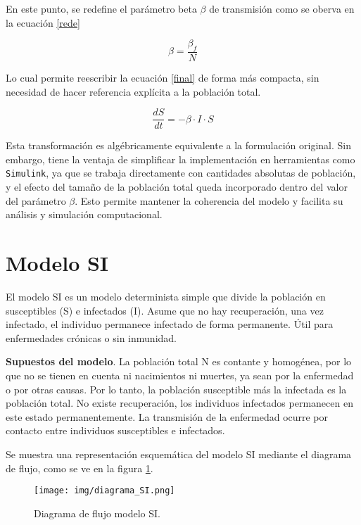 En este punto, se redefine el parámetro beta $\beta$ de transmisión como se oberva en la ecuación \eqref{rede} 

\begin{equation}
    \beta = \frac{\beta_f}{N}
\label{rede}
\end{equation}

Lo cual permite reescribir la ecuación \eqref{final} de forma más compacta, sin necesidad de hacer referencia explícita a la población total.

\begin{equation}
    \frac{dS}{dt} = -\beta \cdot I \cdot S
\label{final}
\end{equation}

Esta transformación es algébricamente equivalente a la formulación original. Sin embargo, tiene la ventaja de simplificar la implementación en herramientas como \texttt{Simulink}, ya que se trabaja directamente con cantidades absolutas de población, y el efecto del tamaño de la población total queda incorporado dentro del valor del parámetro \( \beta \). Esto permite mantener la coherencia del modelo y facilita su análisis y simulación computacional.





\section{Modelo SI}
El modelo SI es un modelo determinista simple que divide la población en susceptibles (S) e infectados (I). Asume que no hay recuperación, una vez infectado, el individuo permanece infectado de forma permanente. Útil para enfermedades crónicas o sin inmunidad.

\textbf{Supuestos del modelo}. La población total N es contante y homogénea, por lo que no se tienen en cuenta ni nacimientos ni muertes, ya sean por la enfermedad o por otras causas. Por lo tanto, la población susceptible más la infectada es la población total. No existe recuperación, los individuos infectados permanecen en este estado permanentemente. La transmisión de la enfermedad ocurre por contacto entre individuos susceptibles e infectados.

Se muestra una representación esquemática del modelo SI mediante el diagrama de flujo, como se ve en la figura \ref{fig:diagrama SI}.

\begin{figure}[H]
    \centering
    \texttt{[image: img/diagrama\_SI.png]}
    \caption{Diagrama de flujo modelo SI.}
    \label{fig:diagrama SI}
    \vspace{0.5cm} %
\end{figure}

